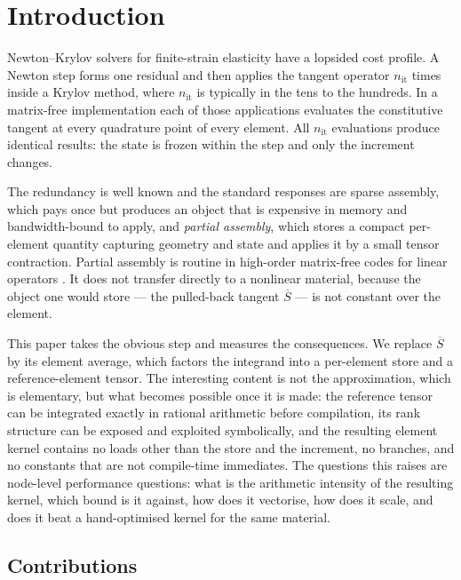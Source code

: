 \documentclass[11pt]{article}
\newcommand{\Sbar}{\overline{S}}
\begin{document}
\tableofcontents

\section{Introduction}

Newton--Krylov solvers for finite-strain elasticity have a lopsided cost
profile.  A Newton step forms one residual and then applies the tangent operator
$n_{\mathrm{it}}$ times inside a Krylov method, where $n_{\mathrm{it}}$ is
typically in the tens to the hundreds.  In a matrix-free implementation each of
those applications evaluates the constitutive tangent at every quadrature point
of every element.  All $n_{\mathrm{it}}$ evaluations produce identical results:
the state is frozen within the step and only the increment changes.

The redundancy is well known and the standard responses are sparse assembly,
which pays once but produces an object that is expensive in memory and
bandwidth-bound to apply, and \emph{partial assembly}, which stores a compact
per-element quantity capturing geometry and state and applies it by a small
tensor contraction.  Partial assembly is routine in high-order matrix-free codes
for linear operators \cite{Orszag1980,DevilleFischerMund2002,KronbichlerKormann2012,Kolev2021,libCEED2021}.
It does not transfer directly to a nonlinear material, because the object one
would store --- the pulled-back tangent $\Sbar$ --- is not constant over the
element.

This paper takes the obvious step and measures the consequences.  We replace
$\Sbar$ by its element average, which factors the integrand into a per-element
store and a reference-element tensor.  The interesting content is not the
approximation, which is elementary, but what becomes possible once it is made:
the reference tensor can be integrated exactly in rational arithmetic before
compilation, its rank structure can be exposed and exploited symbolically, and
the resulting element kernel contains no loads other than the store and the
increment, no branches, and no constants that are not compile-time immediates.
The questions this raises are node-level performance questions: what is the
arithmetic intensity of the resulting kernel, which bound is it against, how does
it vectorise, how does it scale, and does it beat a hand-optimised kernel for
the same material.

\subsection*{Contributions}
\end{document}
